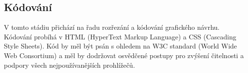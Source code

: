 \subsection{Kódování}
\label{sec:coding}

V tomto stádiu přichází na řadu rozřezání a kódování grafického návrhu. Kódování probíhá v HTML (HyperText Markup Language) a CSS (Cascading Style Sheets). Kód by měl být psán s ohledem na W3C standard (World Wide Web Consortium) a měl by dodržovat osvědčené postupy pro zvýšení čitelnosti a podpory všech nejpoužívanějších prohlížečů.


